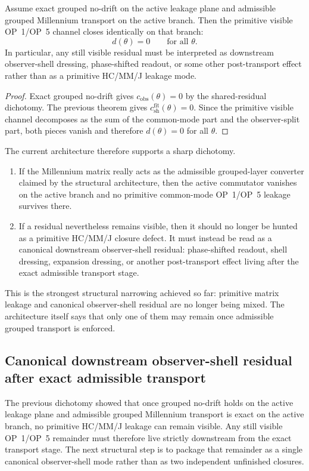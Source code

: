\begin{corollary}
Assume exact grouped no-drift on the active leakage plane and admissible grouped Millennium transport on the active branch. Then the primitive visible OP~1/OP~5 channel closes identically on that branch:
\[
  d(\theta)=0
  \qquad\text{for all }\theta.
\]
In particular, any still visible residual must be interpreted as downstream observer-shell dressing, phase-shifted readout, or some other post-transport effect rather than as a primitive HC/MM/J leakage mode.
\end{corollary}

\begin{proof}
Exact grouped no-drift gives $c_{\mathrm{obs}}(\theta)=0$ by the shared-residual dichotomy. The previous theorem gives $c_{\mathrm{sh}}^{\mathrm{fit}}(\theta)=0$. Since the primitive visible channel decomposes as the sum of the common-mode part and the observer-split part, both pieces vanish and therefore $d(\theta)=0$ for all $\theta$.
\end{proof}

\begin{remark}
The current architecture therefore supports a sharp dichotomy.
\begin{enumerate}[leftmargin=2em,label=(\roman*)]
\item If the Millennium matrix really acts as the admissible grouped-layer converter claimed by the structural architecture, then the active commutator vanishes on the active branch and no primitive common-mode OP~1/OP~5 leakage survives there.
\item If a residual nevertheless remains visible, then it should no longer be hunted as a primitive HC/MM/J closure defect. It must instead be read as a canonical downstream observer-shell residual: phase-shifted readout, shell dressing, expansion dressing, or another post-transport effect living after the exact admissible transport stage.
\end{enumerate}
This is the strongest structural narrowing achieved so far: primitive matrix leakage and canonical observer-shell residual are no longer being mixed. The architecture itself says that only one of them may remain once admissible grouped transport is enforced.
\end{remark}


\subsection*{Canonical downstream observer-shell residual after exact admissible transport}
The previous dichotomy showed that once grouped no-drift holds on the active leakage plane and admissible grouped Millennium transport is exact on the active branch, no primitive HC/MM/J leakage can remain visible. Any still visible OP~1/OP~5 remainder must therefore live strictly downstream from the exact transport stage. The next structural step is to package that remainder as a single canonical observer-shell mode rather than as two independent unfinished closures.

